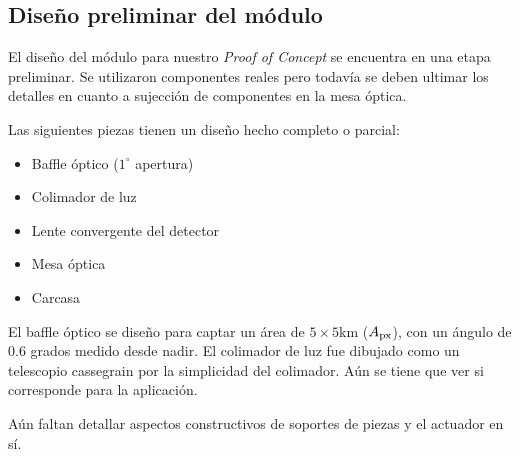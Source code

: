 \documentclass[11pt,titlepage]{article}
\begin{document}
\subsection{Diseño preliminar del módulo}

El diseño del módulo para nuestro \textit{Proof of Concept} se encuentra en una etapa preliminar. Se utilizaron componentes reales pero todavía se deben ultimar los detalles en cuanto a sujección de componentes en la mesa óptica.\par 
Las siguientes piezas tienen un diseño hecho completo o parcial:
\begin{itemize}
    \item Baffle óptico ($1^\circ$ apertura)
    \item Colimador de luz
    \item Lente convergente del detector
    \item Mesa óptica
    \item Carcasa 
\end{itemize}

El baffle óptico se diseño para captar un área de $5\times5$km ($A_{\mathrm{px}}$), con un ángulo de 0.6 grados medido desde nadir. El colimador de luz fue dibujado como un telescopio cassegrain por la simplicidad del colimador. Aún se tiene que ver si corresponde para la aplicación.

Aún faltan detallar aspectos constructivos de soportes de piezas y el actuador en sí.
\end{document}
